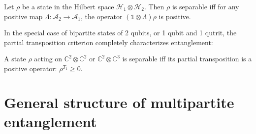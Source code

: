\documentclass[12pt]{report}
\begin{document}
\begin{thm}
	Let $\rho$ be a state in the Hilbert space $\mathcal H_1 \otimes \mathcal H_2$.
	Then $\rho$ is separable iff for any positive map
	$\Lambda : \mathcal A_2 \to \mathcal A_1$,
	the operator $(\mathds1 \otimes \Lambda)\rho$ is positive.
\end{thm}

In the special case of bipartite states of 2 qubits, or 1 qubit and 1 qutrit,
the partial transposition criterion completely characterizes entanglement:
\begin{thm}
	A state $\rho$ acting on $\mathbb C^2 \otimes \mathbb C^2$
	or $\mathbb C^2 \otimes \mathbb C^3$ is separable iff
	its partial transposition is a positive operator: $\rho^{T_1} \ge 0$.
\end{thm}

\section{General structure of multipartite entanglement}
\end{document}
